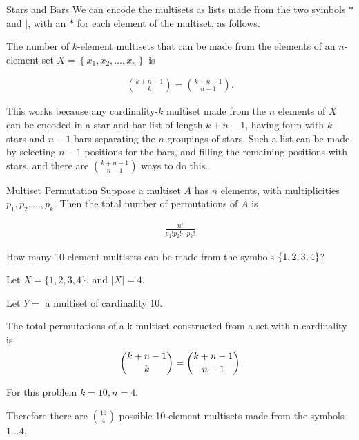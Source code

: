 \documentclass[openany, 12pt]{book}
\begin{document}
\begin{definition}{Stars and Bars}{}
	We can encode the multisets as lists made from the two symbols $*$ and $|$,
	with an $*$ for each element of the multiset, as follows.
\end{definition}

\begin{definition}{}{}
	The number of $k$-element multisets that can be made from the elements of an
	$n$-element set $X=\left\{x_1, x_2, \ldots, x_n\right\}$ is

	\begin{align*}
		\binom{k+n-1}{k}=\binom{k+n-1}{n-1} .
	\end{align*}

	This works because any cardinality-$k$ multiset made from the $n$ elements
	of $X$ can be encoded in a star-and-bar list of length $k+n-1$, having form
	with $k$ stars and $n-1$ bars separating the $n$ groupings of stars. Such a
	list can be made by selecting $n-1$ positions for the bars, and filling the
	remaining positions with stars, and there are $\binom{k+n-1}{n-1}$ ways to
	do this.
\end{definition}

\begin{definition}{Multiset Permutation}{}
	Suppose a multiset $A$ has $n$ elements, with multiplicities $p_1, p_2,
		\ldots, p_k$. Then the total number of permutations of $A$ is

	\begin{align*}
		\frac{n!}{p_{1}!p_{2}!\cdots p_{k}!}
	\end{align*}
\end{definition}


\begin{exercise}{}{}
	How many 10-element multisets can be made from the symbols $\{1,2,3,4\}$?
	\begin{alist}
		\item Let $X= \{ 1,2,3,4\}$, and $|X|=4$.
		\item Let $Y=$ a multiset of cardinality 10.
		\item The total permutations of a k-multiset constructed from a set with
		n-cardinality is
		$$ \dbinom{k+n-1}{k} = \dbinom{k+n-1}{n-1} $$
		\item For this problem $k=10, n=4$.
		\item Therefore there are $\binom{13}{4}$ possible 10-element multisets made
		from the symbols $1\dots4$.
	\end{alist}
\end{exercise}
\end{document}
